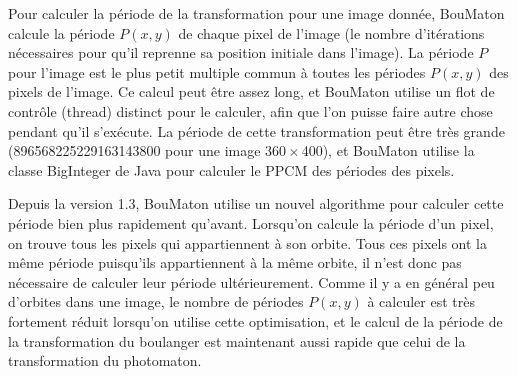 \documentclass[a4paper]{article}
\newcommand{\BouMaton}{\textsf{BouMaton}\xspace}
\newcommand{\picdim}[2]{#1\,\(\times\)\,#2}
\begin{document}
  Pour calculer la période de la transformation pour une image donnée, 
  \BouMaton calcule la période \(P(x,y)\) de chaque pixel de l'image 
  (le nombre d'itérations nécessaires pour qu'il reprenne sa position 
  initiale dans l'image). La période \(P\) pour l'image est le plus 
  petit multiple commun à toutes les périodes \(P(x,y)\) des pixels de 
  l'image. Ce calcul peut être assez long, et \BouMaton utilise un 
  flot de contrôle (thread) distinct pour le calculer, afin que l'on 
  puisse faire autre chose pendant qu'il s'exécute. La période de cette 
  transformation peut être très grande (896568225229163143800 pour une 
  image \picdim{360}{400}), et \BouMaton utilise la classe BigInteger 
  de Java pour calculer le PPCM des périodes des pixels.
  
  Depuis la version 1.3, \BouMaton utilise un nouvel algorithme pour 
  calculer cette période bien plus rapidement qu'avant. Lorsqu'on 
  calcule la période d'un pixel, on trouve tous les pixels qui 
  appartiennent à son orbite. Tous ces pixels ont la même période 
  puisqu'ils appartiennent à la même orbite, il n'est donc pas 
  nécessaire de calculer leur période ultérieurement. Comme il y a en 
  général peu d'orbites dans une image, le nombre de périodes 
  \(P(x,y)\) à calculer est très fortement réduit lorsqu'on utilise 
  cette optimisation, et le calcul de la période de la transformation 
  du boulanger est maintenant aussi rapide que celui de la 
  transformation du photomaton.
  
\end{document}
